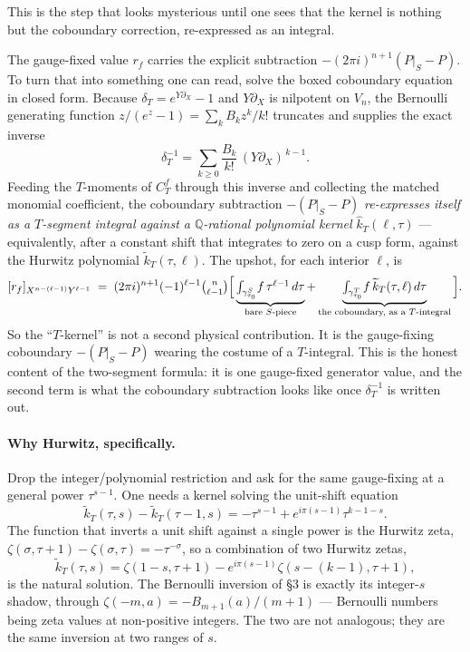 \documentclass[11pt]{article}
\newcommand{\QQ}{\mathbb{Q}}
\newcommand{\ktil}{\widetilde{k}_T}
\newcommand{\khat}{\widehat{k}_T}
\theoremstyle{plain}
\begin{document}
This is the step that looks mysterious until one sees that the kernel is
nothing but the coboundary correction, re-expressed as an integral.

The gauge-fixed value $r_f$ carries the explicit subtraction
$-(2\pi i)^{n+1}(P|_S-P)$. To turn that into something one can read, solve
the boxed coboundary equation in closed form. Because $\delta_T=
e^{Y\partial_X}-1$ and $Y\partial_X$ is nilpotent on $V_n$, the Bernoulli
generating function $z/(e^z-1)=\sum_k B_k z^k/k!$ truncates and supplies the
exact inverse
\[
  \delta_T^{-1}=\sum_{k\ge0}\frac{B_k}{k!}\,(Y\partial_X)^{\,k-1}.
\]
Feeding the $T$-moments of $C^f_T$ through this inverse and collecting the
matched monomial coefficient, the coboundary subtraction
$-(P|_S-P)$ \emph{re-expresses itself as a $T$-segment integral against a
$\QQ$-rational polynomial kernel} $\khat(\ell,\tau)$ --- equivalently,
after a constant shift that integrates to zero on a cusp form, against the
Hurwitz polynomial $\ktil(\tau,\ell)$. The upshot, for each interior
$\ell$, is
\[
  [r_f]_{X^{n-(\ell-1)}Y^{\ell-1}}
  \;=\;(2\pi i)^{n+1}(-1)^{\ell-1}\tbinom{n}{\ell-1}
  \Big[\underbrace{\textstyle\int_{\gamma^S_{\tau_0}}\! f\,\tau^{\ell-1}\,d\tau}_{\text{bare $S$-piece}}
  +\underbrace{\textstyle\int_{\gamma^T_{\tau_0}}\! f\,\ktil(\tau,\ell)\,d\tau}_{\text{the coboundary, as a $T$-integral}}\Big].
\]
So the ``$T$-kernel'' is not a second physical contribution. It is the
gauge-fixing coboundary $-(P|_S-P)$ wearing the costume of a $T$-integral.
This is the honest content of the two-segment formula: it is one
gauge-fixed generator value, and the second term is what the coboundary
subtraction looks like once $\delta_T^{-1}$ is written out.

\paragraph{Why Hurwitz, specifically.}
Drop the integer/polynomial restriction and ask for the same gauge-fixing
at a general power $\tau^{s-1}$. One needs a kernel solving the unit-shift
equation
\[
  \ktil(\tau,s)-\ktil(\tau-1,s)=-\tau^{s-1}+e^{i\pi(s-1)}\tau^{k-1-s}.
\]
The function that inverts a unit shift against a single power is the Hurwitz
zeta, $\zeta(\sigma,\tau+1)-\zeta(\sigma,\tau)=-\tau^{-\sigma}$, so a
combination of two Hurwitz zetas,
\[
  \ktil(\tau,s)=\zeta(1-s,\tau+1)-e^{i\pi(s-1)}\zeta(s-(k-1),\tau+1),
\]
is the natural solution. The Bernoulli inversion of \S3 is exactly its
integer-$s$ shadow, through $\zeta(-m,a)=-B_{m+1}(a)/(m+1)$ --- Bernoulli
numbers being zeta values at non-positive integers. The two are not
analogous; they are the same inversion at two ranges of $s$.
\end{document}
